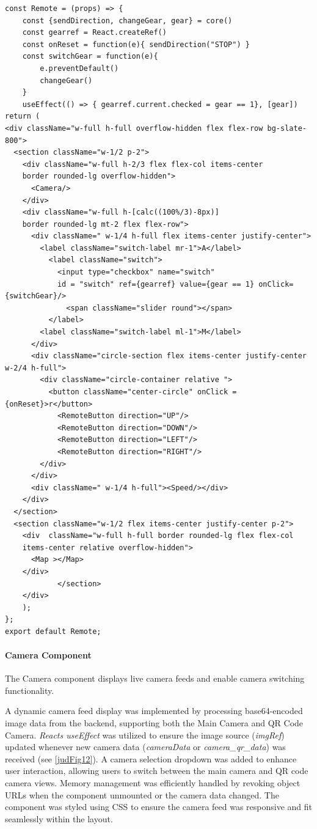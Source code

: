 \documentclass[../../main]{subfiles}
\begin{document}
\begin{codebox}[]{}
  \begin{verbatim}
const Remote = (props) => {
    const {sendDirection, changeGear, gear} = core()
    const gearref = React.createRef()
    const onReset = function(e){ sendDirection("STOP") }
    const switchGear = function(e){
        e.preventDefault()
        changeGear()
    }
    useEffect(() => { gearref.current.checked = gear == 1}, [gear])
return (
<div className="w-full h-full overflow-hidden flex flex-row bg-slate-800">
  <section className="w-1/2 p-2">
    <div className="w-full h-2/3 flex flex-col items-center  
    border rounded-lg overflow-hidden">
      <Camera/>
    </div>
    <div className="w-full h-[calc((100%/3)-8px)] 
    border rounded-lg mt-2 flex flex-row">
      <div className=" w-1/4 h-full flex items-center justify-center">
        <label className="switch-label mr-1">A</label>
          <label className="switch">
            <input type="checkbox" name="switch" 
            id = "switch" ref={gearref} value={gear == 1} onClick={switchGear}/>
              <span className="slider round"></span>
          </label>
        <label className="switch-label ml-1">M</label>
      </div>
      <div className="circle-section flex items-center justify-center  w-2/4 h-full">
        <div className="circle-container relative ">
          <button className="center-circle" onClick = {onReset}>r</button>
            <RemoteButton direction="UP"/>
            <RemoteButton direction="DOWN"/>
            <RemoteButton direction="LEFT"/>
            <RemoteButton direction="RIGHT"/>
        </div>
      </div>
      <div className=" w-1/4 h-full"><Speed/></div>
    </div>
  </section>
  <section className="w-1/2 flex items-center justify-center p-2">
    <div  className="w-full h-full border rounded-lg flex flex-col 
    items-center relative overflow-hidden">
      <Map ></Map>
    </div>
            </section>
    </div>
    );
};
export default Remote;
\end{verbatim}
\end{codebox}


\paragraph{Camera Component}

The Camera component displays live camera feeds and enable camera
switching functionality.

A dynamic camera feed display was implemented by processing
base64-encoded image data from the backend, supporting both the Main
Camera and QR Code Camera. \emph{React\textquotesingle s useEffect} was
utilized to ensure the image source (\emph{imgRef}) updated whenever new
camera data (\emph{cameraData} or \emph{camera\_qr\_data}) was received
(see \cref{judFig12}). A camera selection dropdown was added to enhance user
interaction, allowing users to switch between the main camera and QR
code camera views. Memory management was efficiently handled by revoking
object URLs when the component unmounted or the camera data changed. The
component was styled using CSS to ensure the camera feed was responsive
and fit seamlessly within the layout.
\end{document}
